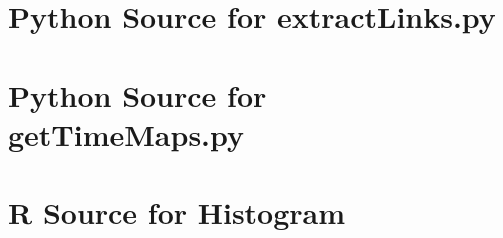 \documentclass[letterpaper,11pt]{report}
\begin{document}



\appendix
{}

\chapter{Python Source for extractLinks.py} \label{chap:Python Source - Extract Links}

\chapter{Python Source for getTimeMaps.py} \label{chap:Python Source - Get TimeMaps}

\chapter{R Source for Histogram} \label{chap:R Source - Histogram}

\end{document}
